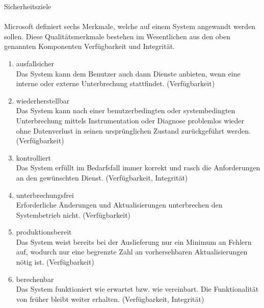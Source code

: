 \begin{section}{Sicherheitsziele}
   \DIFdelbegin %
\DIFdelend \DIFaddbegin \label{Ergänzung: Zuverlässigkeit}
   \\ \\
     \DIFaddend Microsoft definiert sechs Merkmale, welche auf einem System angewandt werden sollen. 
     Diese Qualitätsmerkmale bestehen im Wesentlichen aus den oben genannten Komponenten 
     Verfügbarkeit und Integrität.
     \begin{enumerate} 
      \item ausfallsicher \\
       Das System kann dem Benutzer auch dann Dienste anbieten, wenn eine interne oder 
       externe Unterbrechung stattfindet. (Verfügbarkeit)
      \item wiederherstellbar \\
       Das System kann nach einer benutzerbedingten oder systembedingten Unterbrechung 
       mittels Instrumentation oder Diagnose problemlos wieder ohne Datenverlust in seinen 
       ursprünglichen Zustand zurückgeführt werden. (Verfügbarkeit)
      \item kontrolliert \\
       Das System erfüllt im Bedarfsfall immer korrekt und rasch die Anforderungen an den 
       gewünschten Dienst. (Verfügbarkeit, Integrität)
      \item unterbrechungsfrei \\
       Erforderliche Änderungen und Aktualisierungen unterbrechen den Systembetrieb nicht. 
       (Verfügbarkeit)
      \item produktionsbereit \\
       Das System weist bereits bei der Auslieferung nur ein Minimum an Fehlern auf, 
       wodurch nur eine begrenzte Zahl an vorhersehbaren Aktualisierungen nötig ist. 
       (Verfügbarkeit)
      \item berechenbar \\
       Das System funktioniert wie erwartet bzw. wie vereinbart. Die Funktionalität von 
       früher bleibt weiter erhalten. (Verfügbarkeit, Integrität) \\      
     \DIFdelbegin %
\DIFdelend \end{enumerate}
    \DIFdelbegin %
\DIFdelend %
    \DIFaddbegin \pagebreak
  \DIFaddend \end{section}

